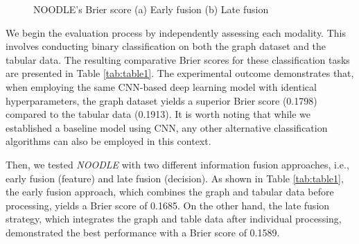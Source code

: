 \begin{figure}[]
\centering
  \caption{NOODLE's Brier score (a) Early fusion (b) Late fusion}
  \label{fig:gan}
\end{figure}

We begin the evaluation process by independently assessing each modality. This involves conducting binary classification on both the graph dataset and the tabular data. The resulting comparative Brier scores for these classification tasks are presented in Table \ref{tab:table1}. The experimental outcome demonstrates that, when employing the same CNN-based deep learning model with identical hyperparameters, the graph dataset yields a superior Brier score (0.1798) compared to the tabular data (0.1913). It is worth noting that while we established a baseline model using CNN, any other alternative classification algorithms can also be employed in this context.

Then, we tested \textit{NOODLE} with two different information fusion approaches, i.e., early fusion (feature) and late fusion (decision). As shown in Table \ref{tab:table1}, the early fusion approach, which combines the graph and tabular data before processing, yields a Brier score of 0.1685. On the other hand, the late fusion strategy, which integrates the graph and table data after individual processing, demonstrated the best performance with a Brier score of 0.1589.

